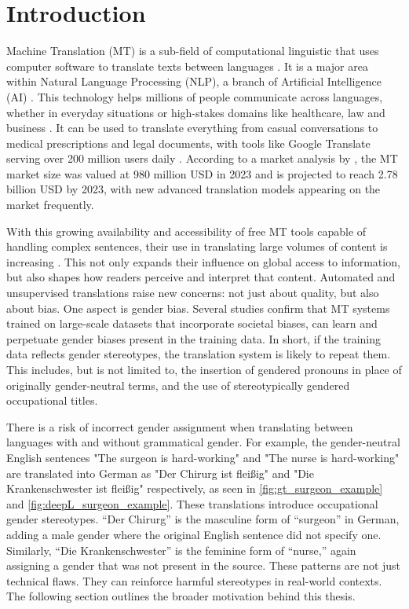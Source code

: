 \chapter{Introduction}
Machine Translation (MT) is a sub-field of computational linguistic that uses computer software to translate texts between languages \citep{linMachineTranslationAcademic2009}. It is a major area within Natural Language Processing (NLP), a branch of Artificial Intelligence (AI) \citep{smacchiaDoesAIReflect2024}. This technology helps millions of people communicate across languages, whether in everyday situations or high-stakes domains like healthcare, law and business \citep{kapplAreAllSpanish2025}. It can be used to translate everything from casual conversations to medical prescriptions and legal documents, with tools like Google Translate serving over 200 million users daily \citep{pratesAssessingGenderBias2019,shresthaExploringGenderBiases2022}. According to a market analysis by \citet{skyquestMachineTranslationMT2025}, the MT market size was valued at 980 million USD in 2023 and is projected to reach 2.78 billion USD by 2023, with new advanced translation models appearing on the market frequently.

With this growing availability and accessibility of free MT tools capable of handling complex sentences, their use in translating large volumes of content is increasing \citep{thompsonShockingAmountWeb2024}. This not only expands their influence on global access to information, but also shapes how readers perceive and interpret that content. Automated and unsupervised translations raise new concerns: not just about quality, but also about bias. One aspect is gender bias. Several studies \citep{smacchiaDoesAIReflect2024,choMeasuringGenderBias2019,stanczakSurveyGenderBias2021,soundararajanInvestigatingGenderBias2024} confirm that MT systems trained on large-scale datasets that incorporate societal biases, can learn and perpetuate gender biases present in the training data. In short, if the training data reflects gender stereotypes, the translation system is likely to repeat them. This includes, but is not limited to, the insertion of gendered pronouns in place of originally gender-neutral terms, and the use of stereotypically gendered occupational titles.

There is a risk of incorrect gender assignment when translating between languages with and without grammatical gender. For example, the gender-neutral English sentences "The surgeon is hard-working" and "The nurse is hard-working" are translated into German as "Der Chirurg ist fleißig" and "Die Krankenschwester ist fleißig" respectively, as seen in \autoref{fig:gt_surgeon_example} and \autoref{fig:deepL_surgeon_example}. These translations introduce occupational gender stereotypes. “Der Chirurg” is the masculine form of “surgeon” in German, adding a male gender where the original English sentence did not specify one. Similarly, “Die Krankenschwester” is the feminine form of “nurse,” again assigning a gender that was not present in the source. These patterns are not just technical flaws. They can reinforce harmful stereotypes in real-world contexts. The following section outlines the broader motivation behind this thesis.


